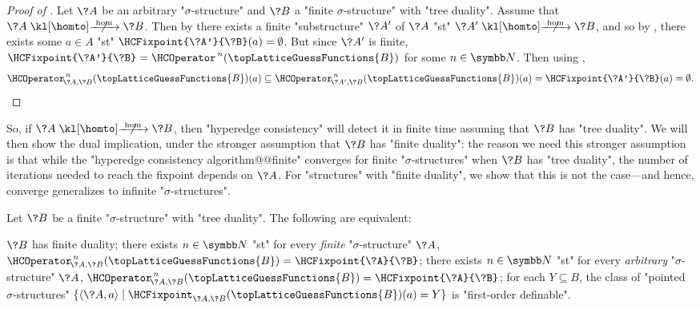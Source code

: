 \begin{proof}[Proof of ]
	Let $\?A$ be an arbitrary "$\sigma$-structure" and $\?B$ a "finite $\sigma$-structure"
	with "tree duality". Assume that $\?A \nothomto \?B$.
	Then by  there exists a finite "substructure" $\?A'$
	of $\?A$ "st" $\?A' \nothomto \?B$,
	and so by ,
	there exists some $a\in A$ "st" $\HCFixpoint{\?A'}{\?B}(a) = \emptyset$.
	But since $\?A'$ is finite, $\HCFixpoint{\?A'}{\?B} = \HCOperator^{\,n}(\topLatticeGuessFunctions{B})$ for some $n\in\N$. Then using ,
	\[
		\HCOperator_{\!\?A,\?B}^{\,n}(\topLatticeGuessFunctions{B})(a)
		\subseteq \HCOperator_{\!\?A',\?B}^{\,n}(\topLatticeGuessFunctions{B})(a)
		= \HCFixpoint{\?A'}{\?B}(a)
		= \emptyset.\qedhere
	\]
\end{proof}

So, if $\?A \nothomto \?B$, then "hyperedge consistency" will detect it in finite time assuming 
that $\?B$ has "tree duality".
We will then show the dual implication, under the stronger assumption that $\?B$ has "finite 
duality": the reason we need this stronger assumption is that while the "hyperedge consistency algorithm@@finite" converges for finite "$\sigma$-structures" when $\?B$ has "tree duality",
the number of iterations needed to reach the fixpoint depends on $\?A$. For "structures"
with "finite duality", we show that this is not the case---and hence, converge generalizes to 
infinite "$\sigma$-structures".

\begin{lemma}
	\AP\label{lem:hyperedge-consistency-uniform-convergence}
	Let $\?B$ be a finite "$\sigma$-structure" with "tree duality".
	The following are equivalent:
	\begin{enumerate}
		\itemAP\label{item:hc-uniform-finite-duality}%
			$\?B$ has finite duality;
		\itemAP\label{item:hc-uniform-finite-structures}%
			there exists $n\in\N$ "st" for every \emph{finite} "$\sigma$-structure" $\?A$, $\HCOperator^{\,n}_{\!\?A,\?B}(\topLatticeGuessFunctions{B}) = \HCFixpoint{\?A}{\?B}$;
		\itemAP\label{item:hc-uniform-arbitrary-structures}%
			there exists $n\in\N$ "st" for every \emph{arbitrary} "$\sigma$-structure" $\?A$, $\HCOperator^{\,n}_{\!\?A,\?B}(\topLatticeGuessFunctions{B}) = \HCFixpoint{\?A}{\?B}$;
		\itemAP\label{item:hc-uniform-first-order}%
			for each $Y \subseteq B$, the class of "pointed $\sigma$-structures"
			$\{\langle \?A, a \rangle \mid \HCFixpoint_{\?A,\?B}(\topLatticeGuessFunctions{B})(a) = Y\}$ is "first-order definable".
	\end{enumerate}
\end{lemma}

